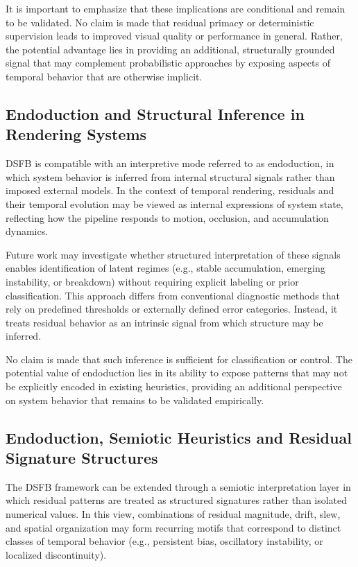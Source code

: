 \documentclass[11pt,letterpaper]{article}
\theoremstyle{gcresult}
\theoremstyle{definition}
\begin{document}
It is important to emphasize that these implications are conditional and remain to be validated. No claim is made that residual primacy or deterministic supervision leads to improved visual quality or performance in general. Rather, the potential advantage lies in providing an additional, structurally grounded signal that may complement probabilistic approaches by exposing aspects of temporal behavior that are otherwise implicit.

\subsection*{Endoduction and Structural Inference in Rendering Systems}

DSFB is compatible with an interpretive mode referred to as endoduction, in which system behavior is inferred from internal structural signals rather than imposed external models. In the context of temporal rendering, residuals and their temporal evolution may be viewed as internal expressions of system state, reflecting how the pipeline responds to motion, occlusion, and accumulation dynamics. 

Future work may investigate whether structured interpretation of these signals enables identification of latent regimes (e.g., stable accumulation, emerging instability, or breakdown) without requiring explicit labeling or prior classification. This approach differs from conventional diagnostic methods that rely on predefined thresholds or externally defined error categories. Instead, it treats residual behavior as an intrinsic signal from which structure may be inferred. 

No claim is made that such inference is sufficient for classification or control. The potential value of endoduction lies in its ability to expose patterns that may not be explicitly encoded in existing heuristics, providing an additional perspective on system behavior that remains to be validated empirically.

\subsection{Endoduction, Semiotic Heuristics and Residual Signature Structures}

The DSFB framework can be extended through a semiotic interpretation layer in which residual patterns are treated as structured signatures rather than isolated numerical values. In this view, combinations of residual magnitude, drift, slew, and spatial organization may form recurring motifs that correspond to distinct classes of temporal behavior (e.g., persistent bias, oscillatory instability, or localized discontinuity).
\end{document}
